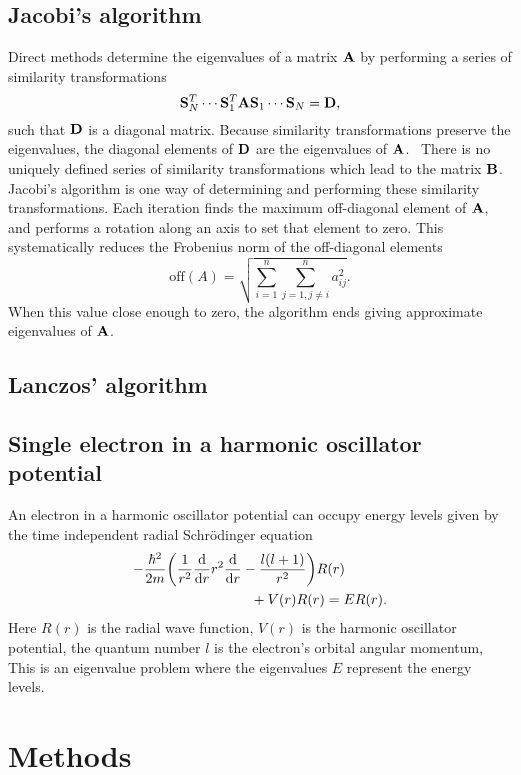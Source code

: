 \documentclass[a4paper,10pt,twocolumn]{article}
\newcommand{\note}[1]{{\color{red}\quad[$\backslash!/$: #1]}}	%
\begin{document}
\subsection*{Jacobi's algorithm}
Direct methods determine the eigenvalues of a matrix $\vb{A}$ by performing a series of similarity transformations 
\[
\vb{S}_N^T \cdots \vb{S}_1^T \vb{A} \vb{S}_1\cdots \vb{S}_N = \vb{D}, 
\]
such that $\vb{D}$ is a diagonal matrix. Because similarity transformations preserve the eigenvalues, the diagonal elements of $\vb{D}$ are the eigenvalues of $\vb{A}$. 
There is no uniquely defined series of similarity transformations which lead to the matrix $\vb{B}$. 
Jacobi's algorithm is one way of determining and performing these similarity transformations. 
Each iteration finds the maximum off-diagonal element of $\vb{A}$, and performs a rotation along an axis to set that element to zero. This systematically reduces the Frobenius norm of the off-diagonal elements
\[
\mathrm{off}(A) = \sqrt{\sum_{i=1}^n\sum_{j=1,j\neq i}^n a_{ij}^2}.
\]
When this value close enough to zero, the algorithm ends giving approximate eigenvalues of $\vb{A}$.

\subsection*{Lanczos' algorithm}

\subsection*{Single electron in a harmonic oscillator potential}
An electron in a harmonic oscillator potential can occupy energy levels given by the time independent radial Schrödinger equation \cite{labtext}
\begin{align}\label{eq:schrodinger}
-\frac{\hbar^2}{2m}&\qty(\frac{1}{r^2}\dv{r}r^2\dv{r}-\frac{l(l+1)}{r^2})R(r) 
\\ &\qquad\qquad\qquad+ V(r)R(r) = ER(r). \nonumber
\end{align} 
Here $R(r)$ is the radial wave function, 
$V(r)$ is the harmonic oscillator potential,
the quantum number $l$ is the electron's orbital angular momentum,
This is an eigenvalue problem where the eigenvalues $E$ represent the energy levels.
\note{scaling in methods}

%
%
%
\section*{Methods}
\end{document}
